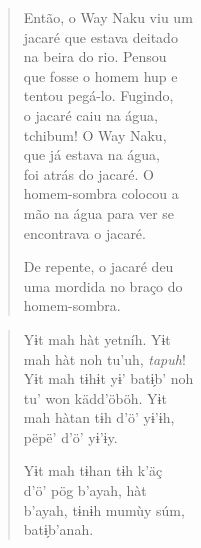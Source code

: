 \begin{verse}
Então, o Way Naku viu um\\
jacaré que estava deitado\\
na beira do rio. Pensou\\
que fosse o homem hup e\\
tentou pegá-lo. Fugindo,\\
o jacaré caiu na água,\\
tchibum! O Way Naku,\\
que já estava na água,\\
foi atrás do jacaré. O\\
homem-sombra colocou a\\
mão na água para ver se\\
encontrava o jacaré.

De repente, o jacaré deu\\
uma mordida no braço do\\
homem-sombra.
\end{verse}

\begin{verse}
Yɨt mah hàt yetníh. Yɨt\\
mah hàt noh tu’uh, \textit{tapuh}!\\
Yɨt mah tɨhɨt yɨ’ batɨ̗b’ noh\\
tu’ won kädd’öböh. Yɨt\\
mah hàtan tɨh d’ö’ yɨ’ɨh,\\
pëpë’ d’ö’ yɨ’ɨy.

Yɨt mah tɨhan tɨh k’äç\\
d’ö’ pög b’ayah, hàt\\
b’ayah, tɨnɨh mumùy súm,\\
batɨ̗b’anah.
\end{verse}

\vspace*{\fill}

